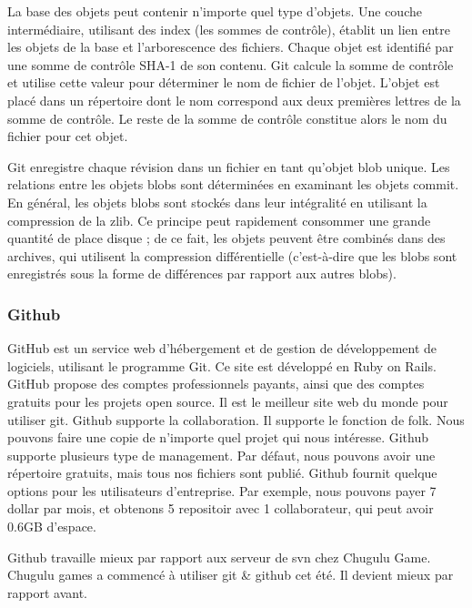 La base des objets peut contenir n'importe quel type d'objets. Une couche intermédiaire, utilisant des index (les sommes de contrôle), établit un lien entre les objets de la base et l'arborescence des fichiers.
Chaque objet est identifié par une somme de contrôle SHA-1 de son contenu. Git calcule la somme de contrôle et utilise cette valeur pour déterminer le nom de fichier de l'objet. L'objet est placé dans un répertoire dont le nom correspond aux deux premières lettres de la somme de contrôle. Le reste de la somme de contrôle constitue alors le nom du fichier pour cet objet.

Git enregistre chaque révision dans un fichier en tant qu'objet blob unique. Les relations entre les objets blobs sont déterminées en examinant les objets commit. En général, les objets blobs sont stockés dans leur intégralité en utilisant la compression de la zlib. Ce principe peut rapidement consommer une grande quantité de place disque ; de ce fait, les objets peuvent être combinés dans des archives, qui utilisent la compression différentielle (c'est-à-dire que les blobs sont enregistrés sous la forme de différences par rapport aux autres blobs).

\subsubsection{Github} %


GitHub est un service web d'hébergement et de gestion de développement de logiciels, utilisant le programme Git. Ce site est développé en Ruby on Rails. GitHub propose des comptes professionnels payants, ainsi que des comptes gratuits pour les projets open source. Il est le meilleur site web du monde pour utiliser git. Github supporte la collaboration. Il supporte le fonction de folk. Nous pouvons faire une copie de n'importe quel projet qui nous intéresse. Github supporte plusieurs type de management. Par défaut, nous pouvons avoir une répertoire gratuits, mais tous nos fichiers sont publié. Github fournit quelque options pour les utilisateurs d'entreprise. Par exemple, nous pouvons payer 7 dollar par mois, et obtenons 5 repositoir avec 1 collaborateur, qui peut avoir 0.6GB d'espace. 

Github travaille mieux par rapport aux serveur de svn chez Chugulu Game. Chugulu games a commencé à utiliser git & github cet été. Il devient mieux par rapport avant.

